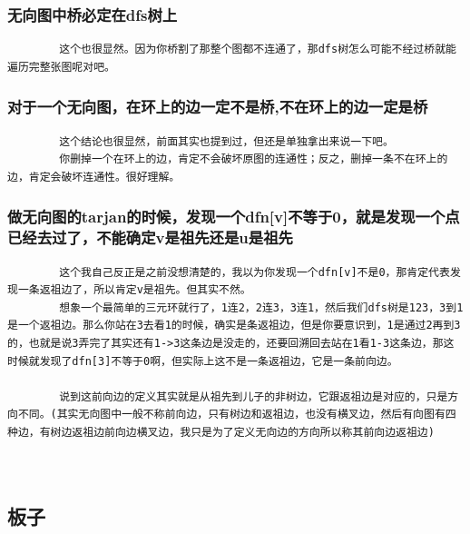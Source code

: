 \documentclass[10pt, a4paper, twocolumn]{article} %
\begin{document}
    \subsubsection{无向图中桥必定在dfs树上}
    \begin{lstlisting}
        这个也很显然。因为你桥割了那整个图都不连通了，那dfs树怎么可能不经过桥就能遍历完整张图呢对吧。
    \end{lstlisting}
    \subsubsection{对于一个无向图，在环上的边一定不是桥,不在环上的边一定是桥}
    \begin{lstlisting}
        这个结论也很显然，前面其实也提到过，但还是单独拿出来说一下吧。
        你删掉一个在环上的边，肯定不会破坏原图的连通性；反之，删掉一条不在环上的边，肯定会破坏连通性。很好理解。
    \end{lstlisting}
    \subsubsection{做无向图的tarjan的时候，发现一个dfn[v]不等于0，就是发现一个点已经去过了，不能确定v是祖先还是u是祖先}
    \begin{lstlisting}
        这个我自己反正是之前没想清楚的，我以为你发现一个dfn[v]不是0，那肯定代表发现一条返祖边了，所以肯定v是祖先。但其实不然。
        想象一个最简单的三元环就行了，1连2，2连3，3连1，然后我们dfs树是123，3到1是一个返祖边。那么你站在3去看1的时候，确实是条返祖边，但是你要意识到，1是通过2再到3的，也就是说3弄完了其实还有1->3这条边是没走的，还要回溯回去站在1看1-3这条边，那这时候就发现了dfn[3]不等于0啊，但实际上这不是一条返祖边，它是一条前向边。

        说到这前向边的定义其实就是从祖先到儿子的非树边，它跟返祖边是对应的，只是方向不同。(其实无向图中一般不称前向边，只有树边和返祖边，也没有横叉边，然后有向图有四种边，有树边返祖边前向边横叉边，我只是为了定义无向边的方向所以称其前向边返祖边)

        
    \end{lstlisting}
    \subsection{板子}
\end{document}

